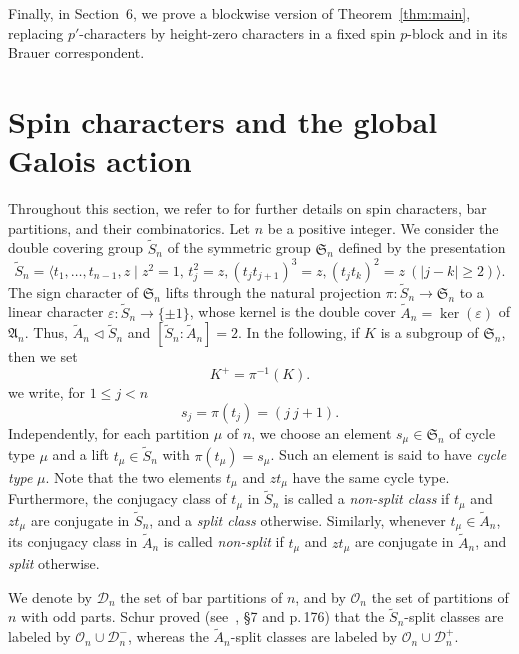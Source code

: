 \documentclass[reqno]{amsart}
\newcommand{\tSym}{\widetilde{S}}
\newcommand{\sym}{\mathfrak{S}}
\newcommand{\tAlt}{\widetilde{A}}
\newcommand{\alt}{\mathfrak{A}}
\theoremstyle{definition}
\begin{document}
Finally, in Section~6, we prove a blockwise version of
Theorem~\ref{thm:main}, replacing $p'$-characters by height-zero
characters in a fixed spin $p$-block and in its Brauer correspondent.

\section{Spin characters and the global Galois action }
\label{sec:part1}

Throughout this section, we refer to \cite{olsson} for further details
on spin characters, bar partitions, and their combinatorics.
Let $n$ be a positive integer. We consider the double covering group
$\tSym_n$ of the symmetric group $\sym_n$ defined by the presentation
$$
\tSym_n=\langle t_1,\ldots,t_{n-1},z\mid z^2=1,\,t_j^2=z,
(t_jt_{j+1})^3=z,(t_jt_k)^2=z\ (|j-k|\geq 2)
\rangle.
$$
The sign character of $\sym_n$ lifts through the natural projection
$\pi:\tSym_n\longrightarrow \sym_n$ to a linear character $
\varepsilon:\tSym_n\longrightarrow\{\pm1\} $, whose kernel is the
double cover $ \tAlt_n=\ker(\varepsilon) $ of $\alt_n$. Thus,
$ \tAlt_n\triangleleft\tSym_n$ and 
$[\tSym_n:\tAlt_n]=2$. 
In the following, if $K$ is a subgroup of $\sym_n$, then we set
\begin{equation}
\label{eq:Ktilde}
K^+=\pi^{-1}(K).
\end{equation}
we write, for $1\leq j<n$
\[
s_j=\pi(t_j)=(j\ j+1).
\]
Independently, for each partition $\mu$ of $n$, we choose an element
$s_\mu\in\sym_n$ of cycle type $\mu$ and a lift $t_\mu\in\tSym_n$ with
$\pi(t_\mu)=s_\mu$.
Such an element is said to have \emph{cycle type}
$\mu$. Note that the two elements $t_{\mu}$ and $zt_{\mu}$
have the same cycle type. 
Furthermore, the conjugacy class of \(t_{\mu}\) in \(\tSym_n\) is
called a \emph{non-split class} if \(t_{\mu}\) and
\(zt_{\mu}\) are conjugate in \(\tSym_n\), and a \emph{split class}
otherwise. Similarly, whenever \(t_{\mu}\in\tAlt_n\), its
conjugacy class in \(\tAlt_n\) is called \emph{non-split} if
\(t_{\mu}\) and \(zt_{\mu}\) are conjugate in \(\tAlt_n\), and
\emph{split} otherwise.


We denote by $\mathcal D_n$ the set of bar partitions of $n$, and by 
$\mathcal{O}_n$ the set of partitions of $n$ with
odd parts. Schur proved (see~\cite{schur}, \S7 and p.\,176)
that the $\tSym_n$-split classes are labeled by $\mathcal{O}_n\cup
\mathcal{D}^-_n$, whereas the $\tAlt_n$-split classes are labeled by
$\mathcal O_n \cup \mathcal D_n^+$. 
\end{document}

